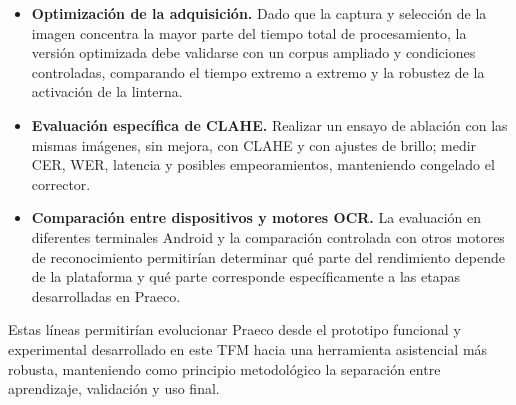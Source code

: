 \begin{itemize}[noitemsep]
    \item \textbf{Optimización de la adquisición.} Dado que la captura y selección de la imagen concentra la mayor parte del tiempo total de procesamiento, la versión optimizada debe validarse con un corpus ampliado y condiciones controladas, comparando el tiempo extremo a extremo y la robustez de la activación de la linterna.

    \item \textbf{Evaluación específica de CLAHE.} Realizar un ensayo de ablación con las mismas imágenes, sin mejora, con CLAHE y con ajustes de brillo; medir CER, WER, latencia y posibles empeoramientos, manteniendo congelado el corrector.

    \item \textbf{Comparación entre dispositivos y motores OCR.} La evaluación en diferentes terminales Android y la comparación controlada con otros motores de reconocimiento permitirían determinar qué parte del rendimiento depende de la plataforma y qué parte corresponde específicamente a las etapas desarrolladas en Praeco.
\end{itemize}

Estas líneas permitirían evolucionar Praeco desde el prototipo funcional y experimental desarrollado en este TFM hacia una herramienta asistencial más robusta, manteniendo como principio metodológico la separación entre aprendizaje, validación y uso final.
